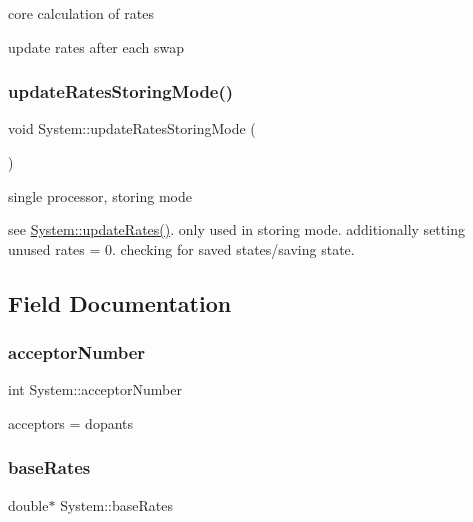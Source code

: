 core calculation of rates

update rates after each swap \mbox{\label{classSystem_a2b1664dce6144f6a8104ebb678fb5c8b}} 
\subsubsection{\texorpdfstring{update\+Rates\+Storing\+Mode()}{updateRatesStoringMode()}}
{\footnotesize\ttfamily void System\+::update\+Rates\+Storing\+Mode (\begin{DoxyParamCaption}{ }\end{DoxyParamCaption})\hspace{0.3cm}{\ttfamily [private]}}

single processor, storing mode

see \hyperlink{classSystem_a1f50240f4eecb60f8302307e6df814af}{System\+::update\+Rates()}. only used in storing mode. additionally setting unused rates = 0. checking for saved states/saving state. 

\subsection{Field Documentation}
\mbox{\label{classSystem_a1537030f9695aa1ec4184cd5669c73c3}} 
\subsubsection{\texorpdfstring{acceptor\+Number}{acceptorNumber}}
{\footnotesize\ttfamily int System\+::acceptor\+Number\hspace{0.3cm}{\ttfamily [private]}}

acceptors = dopants \mbox{\label{classSystem_a046174e3f233b5c31249aaec257c83ff}} 
\subsubsection{\texorpdfstring{base\+Rates}{baseRates}}
{\footnotesize\ttfamily double$\ast$ System\+::base\+Rates\hspace{0.3cm}{\ttfamily [private]}}

